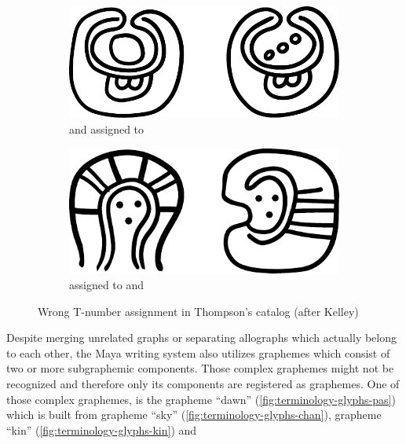 \documentclass[../main.tex]{subfiles}
\begin{document}
\begin{figure}
    \centering
    \begin{subfigure}[b]{0.49\textwidth}
        \centering
        \includegraphics[height=\glyphblockheight]{img/T683a-T683b}
        \caption{ and  assigned to }
        \label{fig:terminology-t683a-t683b}
    \end{subfigure}
    \hfill
    \begin{subfigure}[b]{0.49\textwidth}
        \centering
        \includegraphics[height=\glyphblockheight]{img/T589-T607}
        \caption{ assigned to  and }
        \label{fig:terminology-t589-t607}
    \end{subfigure}
    \caption{Wrong T-number assignment in Thompson's catalog (after Kelley)}
\end{figure}
Despite merging unrelated graphs or separating allographs which actually belong to each other,
the Maya writing system also utilizes graphemes which consist of two or more subgraphemic 
components.
Those complex graphemes might not be recognized and therefore only its components are registered
as graphemes.
One of those complex graphemes, is the grapheme  ``dawn'' 
(\ref{fig:terminology-glyphs-pas}) which is built from
grapheme  ``sky'' (\ref{fig:terminology-glyphs-chan}), 
grapheme  ``k\glottalstop{}in'' (\ref{fig:terminology-glyphs-kin}) and
\end{document}
